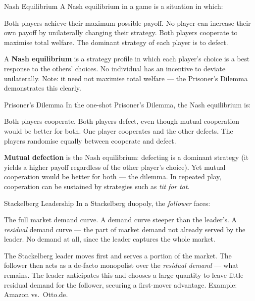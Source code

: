 \documentclass[paper=a5]{scrartcl}
\begin{document}
\begin{question}[type=mc]{Nash Equilibrium}
A Nash equilibrium in a game is a situation in which:
\begin{choices}
  \choice        Both players achieve their maximum possible payoff.
  \correctchoice No player can increase their own payoff by unilaterally
                 changing their strategy.
  \choice        Both players cooperate to maximise total welfare.
  \choice        The dominant strategy of each player is to defect.
\end{choices}
\begin{solution}
  A \textbf{Nash equilibrium} is a strategy profile in which each player's
  choice is a best response to the others' choices. No individual has an
  incentive to deviate unilaterally. Note: it need not maximise total welfare
  — the Prisoner's Dilemma demonstrates this clearly.
\end{solution}
\end{question}

\begin{question}[type=mc]{Prisoner's Dilemma}
In the one-shot Prisoner's Dilemma, the Nash equilibrium is:
\begin{choices}
  \choice        Both players cooperate.
  \correctchoice Both players defect, even though mutual cooperation would be
                 better for both.
  \choice        One player cooperates and the other defects.
  \choice        The players randomise equally between cooperate and defect.
\end{choices}
\begin{solution}
  \textbf{Mutual defection} is the Nash equilibrium: defecting is a dominant
  strategy (it yields a higher payoff regardless of the other player's choice).
  Yet mutual cooperation would be better for both — the dilemma. In repeated
  play, cooperation can be sustained by strategies such as \emph{tit for tat}.
\end{solution}
\end{question}

\begin{question}[type=mc]{Stackelberg Leadership}
In a Stackelberg duopoly, the \emph{follower} faces:
\begin{choices}
  \choice        The full market demand curve.
  \choice        A demand curve steeper than the leader's.
  \correctchoice A \emph{residual} demand curve — the part of market demand
                 not already served by the leader.
  \choice        No demand at all, since the leader captures the whole market.
\end{choices}
\begin{solution}
  The Stackelberg leader moves first and serves a portion of the market. The
  follower then acts as a de-facto monopolist over the \emph{residual demand}
  — what remains. The leader anticipates this and chooses a large quantity to
  leave little residual demand for the follower, securing a first-mover
  advantage. Example: Amazon vs.\ Otto.de.
\end{solution}
\end{question}
\end{document}
